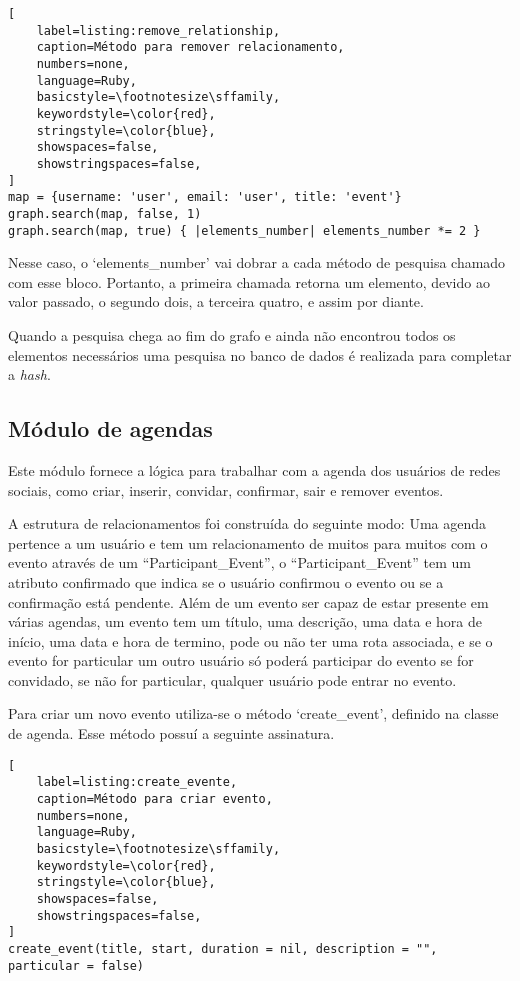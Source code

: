 \begin{lstlisting}[
    label=listing:remove_relationship,
    caption=Método para remover relacionamento,
    numbers=none,
    language=Ruby,
    basicstyle=\footnotesize\sffamily,
    keywordstyle=\color{red},
    stringstyle=\color{blue},
    showspaces=false,
    showstringspaces=false,
]
map = {username: 'user', email: 'user', title: 'event'}
graph.search(map, false, 1)
graph.search(map, true) { |elements_number| elements_number *= 2 }
\end{lstlisting}


Nesse caso, o `elements\_number' vai dobrar a cada método de pesquisa chamado com esse bloco. Portanto, a primeira chamada retorna um elemento, devido ao valor passado, o segundo dois, a terceira quatro, e assim por diante.

Quando a pesquisa chega ao fim do grafo e ainda não encontrou todos os elementos necessários uma pesquisa no banco de dados é realizada para completar a \textit{hash}.

\subsection{Módulo de agendas}

Este módulo fornece a lógica para trabalhar com a agenda dos usuários de redes sociais, como criar, inserir, convidar, confirmar, sair e remover eventos.

A estrutura de relacionamentos foi construída do seguinte modo: Uma agenda pertence a um usuário e tem um relacionamento de muitos para muitos com o evento através de um ``Participant\_Event'', o ``Participant\_Event'' tem um atributo confirmado que indica se o usuário confirmou o evento ou se a confirmação está pendente. Além de um evento ser capaz de estar presente em várias agendas, um evento tem um título, uma descrição, uma data e hora de início, uma data e hora de termino, pode ou não ter uma rota associada, e se o evento for particular um outro usuário só poderá participar do evento se for convidado, se não for particular, qualquer usuário pode entrar no evento.

Para criar um novo evento utiliza-se o método `create\_event', definido na classe de agenda. Esse método possuí a seguinte assinatura.

\begin{lstlisting}[
    label=listing:create_evente,
    caption=Método para criar evento,
    numbers=none,
    language=Ruby,
    basicstyle=\footnotesize\sffamily,
    keywordstyle=\color{red},
    stringstyle=\color{blue},
    showspaces=false,
    showstringspaces=false,
]
create_event(title, start, duration = nil, description = "", particular = false)
\end{lstlisting}

